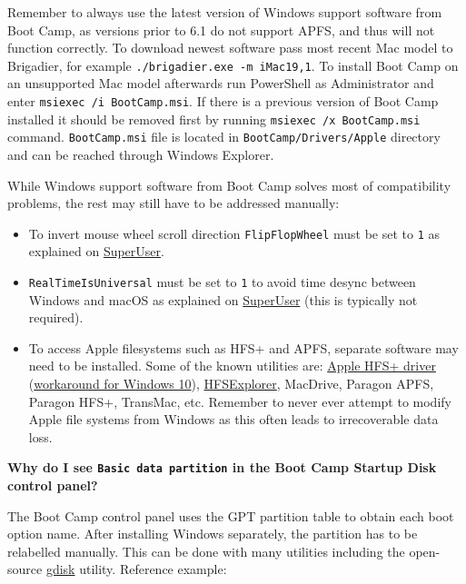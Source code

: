 \documentclass[]{article}
\begin{document}
  Remember to always use the latest version of Windows support software from Boot Camp,
  as versions prior to 6.1 do not support APFS, and thus will not function correctly.
  To download newest software pass most recent Mac model to Brigadier, for example
  \texttt{./brigadier.exe -m iMac19,1}. To install Boot Camp on an unsupported Mac model
  afterwards run PowerShell as Administrator and enter \texttt{msiexec /i BootCamp.msi}.
  If there is a previous version of Boot Camp installed it should be
  removed first by running \texttt{msiexec /x BootCamp.msi} command. \texttt{BootCamp.msi}
  file is located in \texttt{BootCamp/Drivers/Apple} directory and can be reached through
  Windows Explorer.

  While Windows support software from Boot Camp solves most of compatibility problems,
  the rest may still have to be addressed manually:

  \begin{itemize}
  \item To invert mouse wheel scroll direction \texttt{FlipFlopWheel} must be set
  to \texttt{1} as explained on \href{https://superuser.com/a/364353}{SuperUser}.
  \item \texttt{RealTimeIsUniversal} must be set to \texttt{1} to avoid time
  desync between Windows and macOS as explained on
  \href{https://superuser.com/q/494432}{SuperUser} (this is typically not required).
  \item To access Apple filesystems such as HFS+ and APFS, separate software may need to
  be installed. Some of the known utilities are:
  \href{https://forums.macrumors.com/threads/apple-hfs-windows-driver-download.1368010/}{Apple HFS+ driver}
  (\href{https://forums.macrumors.com/threads/apple-hfs-windows-driver-download.1368010/post-24180079}{workaround for Windows 10}),
  \href{http://www.catacombae.org/hfsexplorer}{HFSExplorer}, MacDrive, Paragon APFS,
  Paragon HFS+, TransMac, etc. Remember to never ever attempt to modify Apple file systems
  from Windows as this often leads to irrecoverable data loss.
  \end{itemize}

  \textbf{Why do I see \texttt{Basic data partition} in the Boot Camp Startup Disk control panel?}

  The Boot Camp control panel uses the GPT partition table to obtain each boot option name.
  After installing Windows separately, the partition has to be relabelled manually.
  This can be done with many utilities including the open-source
  \href{https://sourceforge.net/projects/gptfdisk}{gdisk} utility. Reference example:
\end{document}
